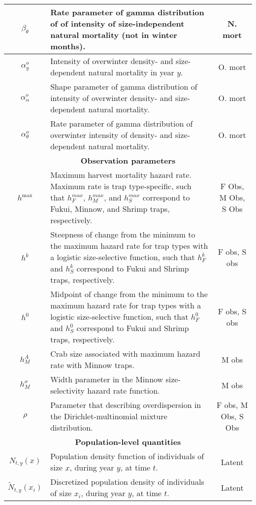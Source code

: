 \documentclass{article}
\begin{document}
\begin{longtable}{||c p{9cm} c||}
 \hline
 $\beta_{\theta}$ & Rate parameter of gamma distribution of of intensity of size-independent natural mortality (not in winter months). & N. mort \\ 
 \hline
 $\alpha^o_y$ & Intensity of overwinter density- and size-dependent natural mortality in year $y$. & O. mort \\ 
 \hline
 $\alpha^o_{\alpha}$ & Shape parameter of gamma distribution of intensity of overwinter density- and size-dependent natural mortality. & O. mort \\ 
 \hline
 $\alpha^o_{\theta}$ & Rate parameter of gamma distribution of overwinter intensity of density- and size-dependent natural mortality. & O. mort \\ 
 \hline\hline
 \multicolumn{3}{||c||}{\textbf{Observation parameters}} \\ 
 \hline
 $h^{\text{max}}$ & Maximum harvest mortality hazard rate. Maximum rate is trap type-specific, such that $h_F^{max}$, $h_M^{max}$, and $h_S^{max}$ correspond to Fukui, Minnow, and Shrimp traps, respectively. & F Obs, M Obs, S Obs \\ 
 \hline
 $h^{k}$ & Steepness of change from the minimum to the maximum hazard rate for trap types with a logistic size-selective function, such that $h_F^{k}$ and $h_S^{k}$ correspond to Fukui and Shrimp traps, respectively. & F obs, S obs \\ 
 \hline
 $h^{0}$ & Midpoint of change from the minimum to the maximum hazard rate for trap types with a logistic size-selective function, such that $h_F^{0}$ and $h_S^{0}$ correspond to Fukui and Shrimp traps, respectively. & F obs, S obs \\ 
 \hline
 $h_M^{A}$ & Crab size associated with maximum hazard rate with Minnow traps. & M obs \\ 
 \hline
 $h_M^{\sigma}$ & Width parameter in the Minnow size-selectivity hazard rate function. & M obs \\ 
 \hline
 $\rho$ & Parameter that describing overdispersion in the Dirichlet-multinomial mixture distribution. & F obs, M Obs, S Obs \\
 \hline\hline
 \multicolumn{3}{||c||}{\textbf{Population-level quantities}} \\ 
 \hline
 $N_{t,y}(x)$ & Population density function of individuals of size $x$, during year $y$, at time $t$. & Latent \\ 
 \hline
 $\tilde{N}_{t,y}(x_i)$ & Discretized population density of individuals of size $x_i$, during year $y$, at time $t$. & Latent \\ 

\end{longtable}
\end{document}

